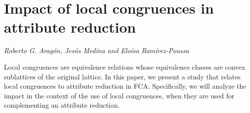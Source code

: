 \documentclass[../booklet.tex]{subfiles}
\begin{document}
\section[Impact of local congruences in attribute reduction. {\it Roberto G. Aragón, Jesús Medina and Eloísa Ramírez-Poussa}]{Impact of local congruences in attribute reduction}
  

\begin{center}
  {\it Roberto G. Aragón, Jesús Medina and Eloísa Ramírez-Poussa}
\end{center}

\vskip 0.8cm


Local congruences are equivalence relations whose equivalence classes are convex sublattices of the original lattice. In this paper, we present a study that relates local congruences to attribute reduction in FCA. Specifically,   we will analyze the impact in the context of the use of local congruences, when they are used  for complementing an attribute reduction.


\end{document}
